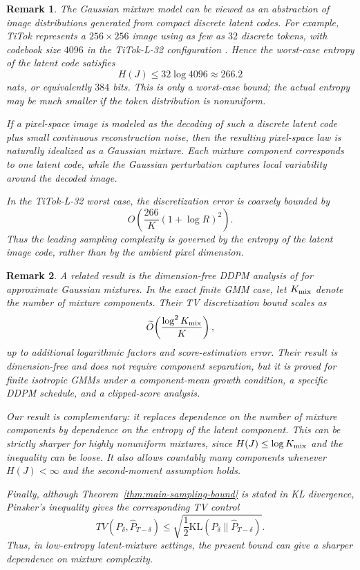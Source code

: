 \documentclass[11pt]{article}
\def\times{×}%
\newtheorem{remark}{Remark}
\newcommand{\KL}{\mathrm{KL}}
\begin{document}
\begin{remark}
\label{rem:titok-gmm}
The Gaussian mixture model can be viewed as an abstraction of image
distributions generated from compact discrete latent codes. For example,
TiTok represents a $256\times256$ image using as few as $32$ discrete tokens,
with codebook size $4096$ in the TiTok-L-32 configuration
\cite{yu2024image}. Hence the worst-case entropy of the latent code satisfies
\[
    H(J)\le 32\log 4096 \approx 266.2
\]
nats, or equivalently \(384\) bits. This is only a worst-case bound; the
actual entropy may be much smaller if the token distribution is nonuniform.

If a pixel-space image is modeled as the decoding of such a discrete latent
code plus small continuous reconstruction noise, then the resulting
pixel-space law is naturally idealized as a Gaussian mixture. Each mixture
component corresponds to one latent code, while the Gaussian perturbation
captures local variability around the decoded image.

In the TiTok-L-32 worst case, the discretization error is coarsely bounded by
\[
    O\!\left(
        \frac{266}{K}(1+\log R)^2
    \right).
\]
Thus the leading sampling complexity is governed by the entropy of the latent
image code, rather than by the ambient pixel dimension.
\end{remark}
\begin{remark}
\label{rem:compare-approx-gmm}
A related result is the dimension-free DDPM analysis of
\cite{li2025dimension} for approximate Gaussian mixtures. In the exact finite
GMM case, let \(K_{\rm mix}\) denote the number of mixture components. Their TV
discretization bound scales as
\[
    \widetilde O\!\left(\frac{\log^2 K_{\rm mix}}{K}\right),
\]
up to additional logarithmic factors and score-estimation error. Their result
is dimension-free and does not require component separation, but it is proved
for finite isotropic GMMs under a component-mean growth condition, a specific
DDPM schedule, and a clipped-score analysis.

Our result is complementary: it replaces dependence on the number of mixture
components by dependence on the entropy of the latent component. This can be
strictly sharper for highly nonuniform mixtures, since \(H(J)\le \log K_{\rm mix}\)
and the inequality can be loose. It also allows countably many components
whenever \(H(J)<\infty\) and the second-moment assumption holds.

Finally, although Theorem~\ref{thm:main-sampling-bound} is stated in KL
divergence, Pinsker's inequality gives the corresponding TV control
\[
    TV(P_\delta,\widehat P_{T-\delta})
    \le
    \sqrt{\frac12
    \KL(P_\delta\|\widehat P_{T-\delta})}.
\]
Thus, in low-entropy latent-mixture settings, the present bound can give a
sharper dependence on mixture complexity.
\end{remark}
\end{document}
